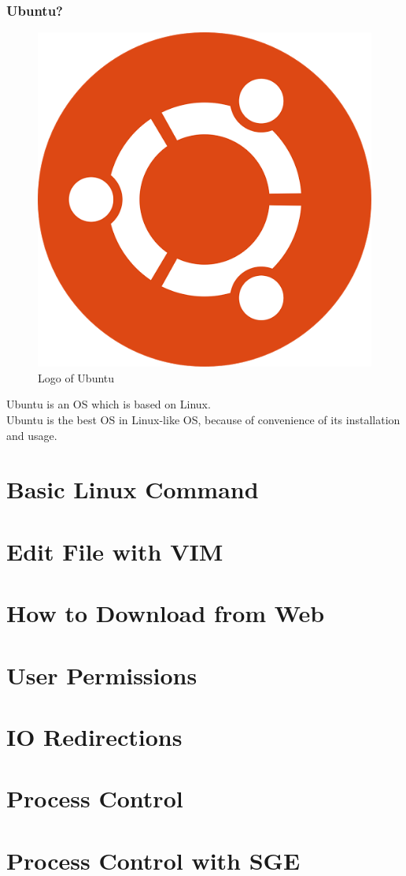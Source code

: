 \documentclass{beamer}
\begin{document}
	\begin{frame}
		\frametitle{Ubuntu?}
		\begin{figure}[h!]
			\centering
			\includegraphics[width=0.3 \linewidth]{figures/ubuntu.jpg}
			\caption{Logo of Ubuntu}
		\end{figure}
		Ubuntu is an OS which is based on Linux. \\
		Ubuntu is the best OS in Linux-like OS, because of convenience of its installation and usage.
	\end{frame}
	
	\section{Basic Linux Command}
	
	\section{Edit File with VIM}
	
	\section{How to Download from Web}
	
	\section{User Permissions}
	
	\section{IO Redirections}
	
	\section{Process Control}
	
	\section{Process Control with SGE}
\end{document}
